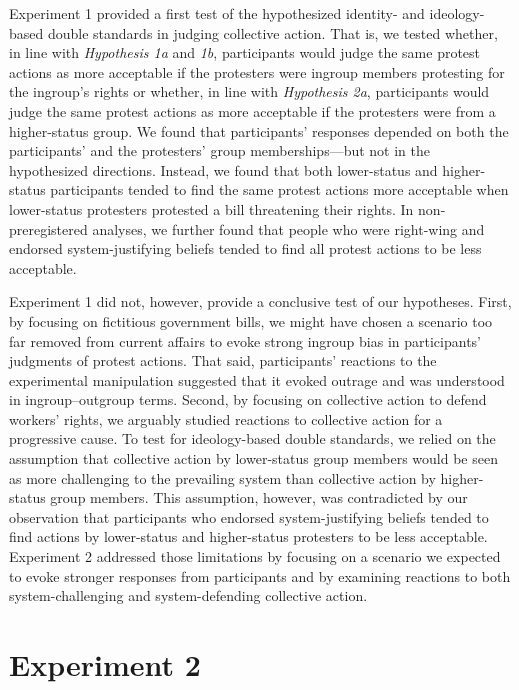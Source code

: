 \documentclass[12pt, letterpaper]{article}
\begin{document}
Experiment 1 provided a first test of the hypothesized identity- and
ideology-based double standards in judging collective action. That is,
we tested whether, in line with \emph{Hypothesis 1a} and \emph{1b},
participants would judge the same protest actions as more acceptable if
the protesters were ingroup members protesting for the ingroup's rights
or whether, in line with \emph{Hypothesis 2a}, participants would judge
the same protest actions as more acceptable if the protesters were from
a higher-status group. We found that participants' responses depended on
both the participants' and the protesters' group memberships---but not
in the hypothesized directions. Instead, we found that both lower-status
and higher-status participants tended to find the same protest actions
more acceptable when lower-status protesters protested a bill
threatening their rights. In non-preregistered analyses, we further
found that people who were right-wing and endorsed system-justifying
beliefs tended to find all protest actions to be less acceptable.

Experiment 1 did not, however, provide a conclusive test of our
hypotheses. First, by focusing on fictitious government bills, we might
have chosen a scenario too far removed from current affairs to evoke
strong ingroup bias in participants' judgments of protest actions. That
said, participants' reactions to the experimental manipulation suggested
that it evoked outrage and was understood in ingroup--outgroup terms.
Second, by focusing on collective action to defend workers' rights, we
arguably studied reactions to collective action for a progressive cause.
To test for ideology-based double standards, we relied on the assumption
that collective action by lower-status group members would be seen as
more challenging to the prevailing system than collective action by
higher-status group members. This assumption, however, was contradicted
by our observation that participants who endorsed system-justifying
beliefs tended to find actions by lower-status and higher-status
protesters to be less acceptable. Experiment 2 addressed those
limitations by focusing on a scenario we expected to evoke stronger
responses from participants and by examining reactions to both
system-challenging and system-defending collective action.

\hypertarget{experiment-2}{%
\section{Experiment 2}\label{experiment-2}}
\end{document}
